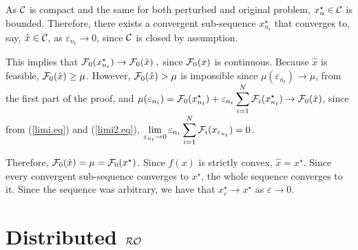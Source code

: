\documentclass[journal,twoside,web]{ieeecolor}
\begin{document}
As ${\cal C}$ is compact and the same for both perturbed and original problem, $x^\star_{n}\in {\cal C}$ is bounded.  Therefore, there exists a convergent sub-sequence $x_{n_t}^\star$ that converges to, say, $\hat{x}\in {\cal C}$, as $\varepsilon_{n_t} \to 0$, since ${\cal C}$ is closed by assumption. 

This implies that
${\cal F}_0(x_{n_t}^\star) \to {\cal F}_0(\hat{x})\;,$ since ${\cal F}_0(x)$ is continuous. 
Because $\hat{x}$ is feasible, ${\cal F}_0(\hat{x})\geq \mu$. 
However,  ${\cal F}_0(\hat{x})>\mu$ is impossible since
$
\mu(\varepsilon_{n_t})\to \mu
$,
from the first part of the proof, and $\displaystyle\mu(\varepsilon_{n_t})={\cal F}_0(x^\star_{n_t})+\varepsilon_{n_t}\sum_{i=1}^N{\cal F}_{i}(x_{n_t}^\star)\to {\cal F}_0(\hat{x})$, since from (\ref{limi.eq}) and (\ref{limi2.eq}), $\displaystyle\lim_{\varepsilon_{n_t}\to 0}
\varepsilon_{n_t}\sum_{i=1}^N{\cal F}_{i}(x_{\varepsilon_{n_t}})=0$\;.

Therefore, ${\cal F}_0(\hat{x})=\mu={\cal F}_0(x^\star)$. Since $f(x)$ is strictly convex, $\hat{x}=x^\star$. Since every convergent sub-sequence converges to $x^\star$, the whole sequence converges to it. Since the sequence was arbitrary, we have that $x^\star_\varepsilon\to x^\star$ as $\varepsilon\to 0$\;.


\iffalse
\section{Distributed ${\cal RO}$} \label{section_distributed}
\end{document}
